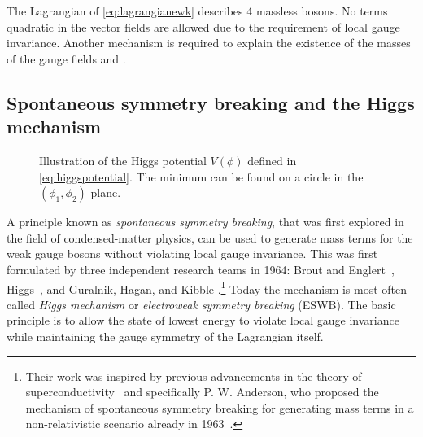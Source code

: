 \noindent The Lagrangian of \cref{eq:lagrangianewk} describes 4 massless bosons. No terms quadratic in the vector fields are allowed due to the requirement of local gauge invariance. 
Another mechanism is required to explain the existence of the masses of the gauge fields \Wpm and \Zboson.



\subsection{Spontaneous symmetry breaking and the Higgs mechanism}
\label{subsec:ewsymbreaking}
\begin{figure}
  \caption{Illustration of the Higgs potential $V(\phi)$ defined in \cref{eq:higgspotential}. The minimum can be found on a circle in the $(\phi_1, \phi_2)$ plane.
  }
  \label{fig:higgspotential}
\end{figure}


A principle known as \emph{spontaneous symmetry breaking}, that was first explored in the field of condensed-matter physics, can be used to generate mass terms for the weak gauge bosons without violating local gauge invariance.
This was first formulated by three independent research teams in 1964: Brout and Englert~\cite{PhysRevLett.13.321}, Higgs~\cite{PhysRevLett.13.508,HIGGS1964132}, and Guralnik, Hagan, and Kibble \cite{PhysRevLett.13.585}.\footnote{Their work was inspired by previous advancements in the theory of superconductivity~\cite{PhysRev.108.1175} and specifically P. W. Anderson, who proposed the mechanism of spontaneous symmetry breaking for generating mass terms in a non-relativistic scenario already in 1963~\cite{PhysRev.130.439}.}
Today the mechanism is most often called \emph{Higgs mechanism} or \emph{electroweak symmetry breaking} (ESWB).
The basic principle is to allow the state of lowest energy to violate local gauge invariance while maintaining the gauge symmetry of the Lagrangian itself.

